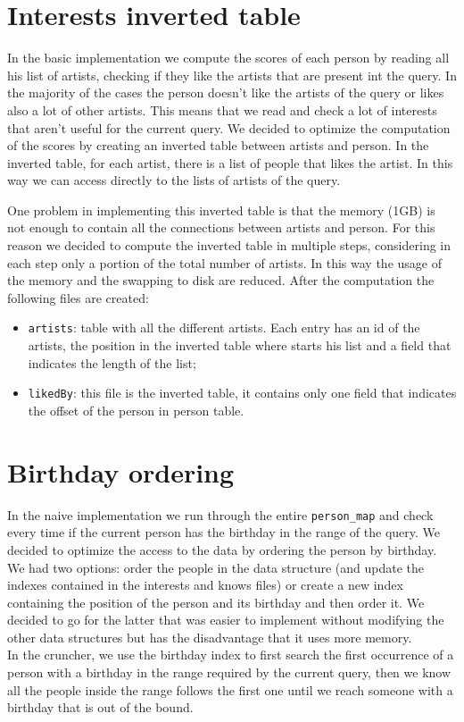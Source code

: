 \section{Interests inverted table}
In the basic implementation we compute the scores of each person by reading all his list of artists, checking if they like the artists that are present int the query. In the majority of the cases the person doesn't like the artists of the query or likes also a lot of other artists. This means that we read and check a lot of interests that aren't useful for the current query. We decided to optimize the computation of the scores by creating an inverted table between artists and person. In the inverted table, for each artist, there is a list of people that likes the artist.
In this way we can access directly to the lists of artists of the query.
\par One problem in implementing this inverted table is that the memory (1GB) is not enough to contain all the connections between artists and person. For this reason we decided to compute the inverted table in multiple steps, considering in each step only a portion of the total number of artists. In this way the usage of the memory and the swapping to disk are reduced.
After the computation the following files are created:
\begin{itemize}
\item \texttt{artists}: table with all the different artists. Each entry has an id of the artists, the position in the inverted table where starts his list and a field that indicates the length of the list;
\item \texttt{likedBy}: this file is the inverted table, it contains only one field that indicates the offset of the person in person table.
\end{itemize}


\section{Birthday ordering}
In the naive implementation we run through the entire \texttt{person\_map} and check every time if the current person has the birthday in the range of the query. We decided to optimize the access to the data by ordering the person by birthday. We had two options: order the people in the data structure (and update the indexes contained in the interests and knows files) or create a new index containing the position of the person and its birthday and then order it. We decided to go for the latter that was easier to implement without modifying the other data structures but has the disadvantage that it uses more memory. \\
In the cruncher, we use the birthday index to first search the first occurrence of a person with a birthday in the range required by the current query, then we know all the people inside the range follows the first one until we reach someone with a birthday that is out of the bound.

